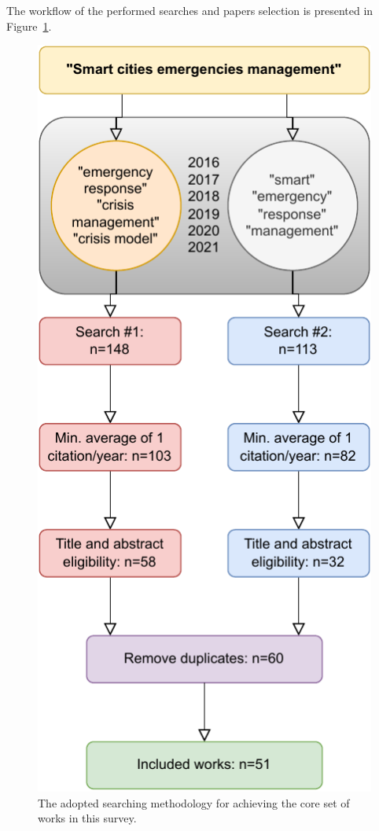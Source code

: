\begin{refsection}
The workflow of the performed searches and papers selection is presented in Figure~\ref{fig:workflow}.

\begin{figure}[htb]
    \centering
    \includegraphics{Chapters/1-Survey/images/fluxograma.pdf}
    \caption{The adopted searching methodology for achieving the core set of works in this survey.}
    \label{fig:workflow}
\end{figure}


\end{refsection}
